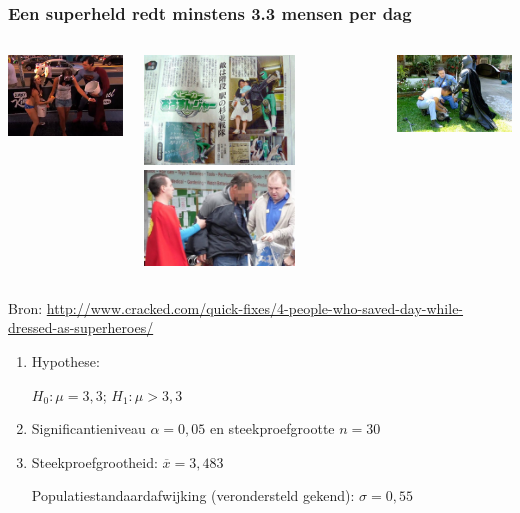 \documentclass{beamer}
\begin{document}
\begin{frame}
  \frametitle{Een superheld redt minstens 3.3 mensen per dag}

  \begin{columns}
    \centering
    \includegraphics[width=4cm]{img/les5-gered1}

    \includegraphics[width=4cm]{img/les5-gered2}
    \centering
    \includegraphics[width=4cm]{img/les5-gered3}

    \includegraphics[width=4cm]{img/les5-gered4}
  \end{columns}

  \vfill
  \centering
  \small{Bron: \url{http://www.cracked.com/quick-fixes/4-people-who-saved-day-while-dressed-as-superheroes/}}
\end{frame}

\begin{frame}
  \begin{enumerate}
    \item Hypothese:
    
    $H_0: \mu = 3,3$; $H_1: \mu > 3,3$
    
    \item Significantieniveau $\alpha = 0,05$ en steekproefgrootte $n = 30$
    
    \item Steekproefgrootheid: $\overline{x} = 3,483$
    
    Populatiestandaardafwijking (verondersteld gekend): $\sigma = 0,55$
  \end{enumerate}
\end{frame}
\end{document}
